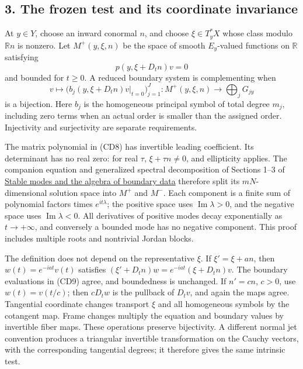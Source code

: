\documentclass[
  11pt,
]{article}
\begin{document}
\subsection{3. The frozen test and its coordinate
invariance}\label{the-frozen-test-and-its-coordinate-invariance}

At \(y\in Y\), choose an inward conormal \(n\), and choose
\(\xi\in T_y^*X\) whose class modulo \(\mathbb Rn\) is nonzero. Let
\(M^+(y,\xi,n)\) be the space of smooth \(E_y\)-valued functions on
\(\mathbb R\) satisfying \[
p(y,\xi+D_tn)v=0
\tag{CD8}
\] and bounded for \(t\geq0\). A reduced boundary system is
complementing when \[
v\longmapsto\big(b_j(y,\xi+D_tn)v|_{t=0}\big)_{j=1}^J:
M^+(y,\xi,n)\longrightarrow\bigoplus_jG_{jy}
\tag{CD9}
\] is a bijection. Here \(b_j\) is the homogeneous principal symbol of
total degree \(m_j\), including zero terms when an actual order is
smaller than the assigned order. Injectivity and surjectivity are
separate requirements.

The matrix polynomial in (CD8) has invertible leading coefficient. Its
determinant has no real zero: for real \(\tau\), \(\xi+\tau n\ne0\), and
ellipticity applies. The companion equation and generalized spectral
decomposition of Sections 1--3 of
\href{stable-boundary-models.pdf}{Stable modes and the algebra of
boundary data} therefore split its \(mN\)-dimensional solution space
into \(M^+\) and \(M^-\). Each component is a finite sum of polynomial
factors times \(e^{it\lambda}\); the positive space uses
\(\operatorname{Im}\lambda>0\), and the negative space uses
\(\operatorname{Im}\lambda<0\). All derivatives of positive modes decay
exponentially as \(t\to+\infty\), and conversely a bounded mode has no
negative component. This proof includes multiple roots and nontrivial
Jordan blocks.

The definition does not depend on the representative \(\xi\). If
\(\xi' =\xi+a n\), then \(w(t)=e^{-iat}v(t)\) satisfies
\((\xi'+D_tn)w=e^{-iat}(\xi+D_tn)v\). The boundary evaluations in (CD9)
agree, and boundedness is unchanged. If \(n'=c n\), \(c>0\), use
\(w(t)=v(t/c)\); then \(cD_tw\) is the pullback of \(D_tv\), and again
the maps agree. Tangential coordinate changes transport \(\xi\) and all
homogeneous symbols by the cotangent map. Frame changes multiply the
equation and boundary values by invertible fiber maps. These operations
preserve bijectivity. A different normal jet convention produces a
triangular invertible transformation on the Cauchy vectors, with the
corresponding tangential degrees; it therefore gives the same intrinsic
test.
\end{document}
